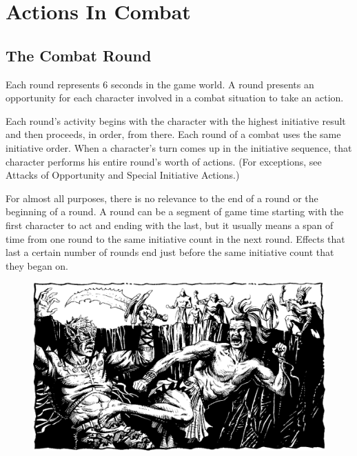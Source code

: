 \section{Actions In Combat}
\subsection{The Combat Round}
Each round represents 6 seconds in the game world. A round presents an opportunity for each character involved in a combat situation to take an action.

Each round's activity begins with the character with the highest initiative result and then proceeds, in order, from there. Each round of a combat uses the same initiative order. When a character's turn comes up in the initiative sequence, that character performs his entire round's worth of actions. (For exceptions, see Attacks of Opportunity and Special Initiative Actions.)

For almost all purposes, there is no relevance to the end of a round or the beginning of a round. A round can be a segment of game time starting with the first character to act and ending with the last, but it usually means a span of time from one round to the same initiative count in the next round. Effects that last a certain number of rounds end just before the same initiative count that they began on.



\begin{figure}[t!]
\centering
\includegraphics[width=\textwidth]{images/monk-1.png}
\WOTC
\end{figure}





